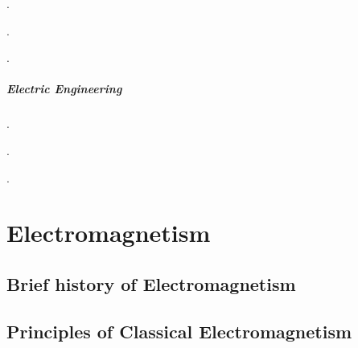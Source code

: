 \documentclass[letterpaper,10pt,english]{jupyterBook}
\begin{document}
\sphinxAtStartPar
{\hyperref[\detokenize{ch/energy:classical-electromagnetism-energy}]{}}.

\sphinxAtStartPar
{\hyperref[\detokenize{ch/regimes-slow:classical-electromagnetism-regimes}]{}}.

\sphinxAtStartPar
{}.
\subsubsection*{Electric Engineering}

\sphinxAtStartPar
{}.

\sphinxAtStartPar
{}.

\sphinxAtStartPar
{}.

\sphinxstepscope


\part{Electromagnetism}

\sphinxstepscope




\chapter{Brief history of Electromagnetism}
\label{\detokenize{ch/experiments:brief-history-of-electromagnetism}}\label{\detokenize{ch/experiments:classical-electromagnetism-first-experiments}}\label{\detokenize{ch/experiments::doc}}
\sphinxstepscope


\chapter{Principles of Classical Electromagnetism}
\label{\detokenize{ch/principles:principles-of-classical-electromagnetism}}\label{\detokenize{ch/principles:classical-electromagnetism-principles}}\label{\detokenize{ch/principles::doc}}
\sphinxstepscope
\end{document}

